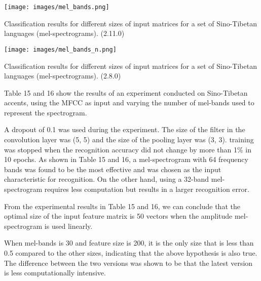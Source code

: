 \documentclass[ams]{U-AizuGT}
\begin{document}
\begin{table}[h]
    \centering
    \texttt{[image: images/mel\_bands.png]}
    \caption{Classification results for different sizes of input matrices for a set of Sino-Tibetan languages (mel-spectrograms). (2.11.0)}
\end{table}
\begin{table}[h]
    \centering
    \texttt{[image: images/mel\_bands\_n.png]}
    \caption{Classification results for different sizes of input matrices for a set of Sino-Tibetan languages (mel-spectrograms). (2.8.0)}
\end{table}
Table 15 and 16 show the results of an experiment conducted on Sino-Tibetan accents, using the MFCC as input and varying the number of mel-bands used to represent the spectrogram.\par
A dropout of 0.1 was used during the experiment. The size of the filter in the convolution layer was (5, 5) and the size of the pooling layer was (3, 3). training was stopped when the recognition accuracy did not change by more than 1\% in 10 epochs.
As shown in Table 15 and 16, a mel-spectrogram with 64 frequency bands was found to be the most effective and was chosen as the input characteristic for recognition. On the other hand, using a 32-band mel-spectrogram requires less computation but results in a larger recognition error.\par
From the experimental results in Table 15 and 16, we can conclude that the optimal size of the input feature matrix is 50 vectors when the amplitude mel-spectrogram is used linearly.\par
When mel-bands is 30 and feature size is 200, it is the only size that is less than 0.5 compared to the other sizes, indicating that the above hypothesis is also true.
The difference between the two versions was shown to be that the latest version is less computationally intensive.
\end{document}
